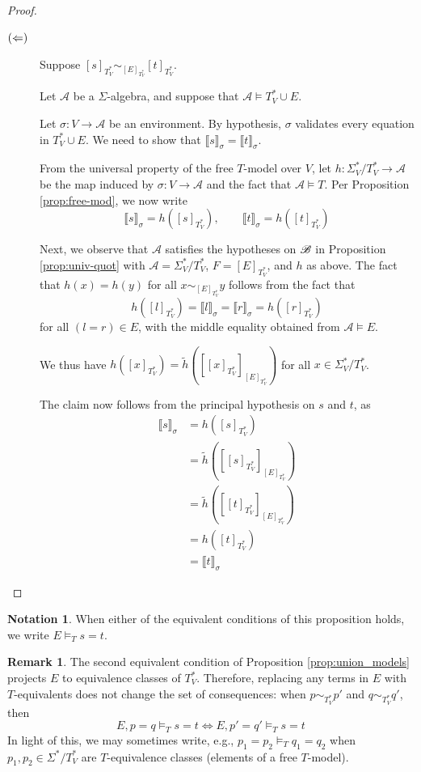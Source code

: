 \documentclass{msthesis}
\theoremstyle{definition}
\newtheorem*{notation}{Notation}
\newtheorem*{remark}{Remark}
\newcommand{\semof}[1]{\llbracket{#1}\rrbracket}
\newcommand{\Amod}{\mathscr{A}}
\begin{document}
\begin{proof}
\begin{description}
    \item[$(\Leftarrow)$]
    Suppose $[s]_{T^*_V} \sim_{[E]_{T^*_V}} [t]_{T^*_V}$.

    Let $\Amod$ be a $\Sigma$-algebra, and suppose that 
    $\Amod \models T^*_V \cup E$.
    
    Let $\sigma : V \to \Amod$ be an environment.  By hypothesis, $\sigma$ validates every equation in $T^*_V \cup E$.  We need to show that 
    $\semof{s}_\sigma = \semof{t}_\sigma$.

    From the universal property of the free $T$-model over $V$, 
    let $h : \Sigma^*_V/T^*_V \to \Amod$ be the map induced 
    by $\sigma : V \to \Amod$ and the fact that $\Amod \models T$.
    Per Proposition \ref{prop:free-mod}, we now write 
    \[ \semof{s}_\sigma = 
    h ([s]_{T^*_V}), \qquad \semof{t}_\sigma = h([t]_{T^*_V})\] 
    
    Next, we observe that $\Amod$ satisfies the hypotheses on $\mathscr{B}$ in
    Proposition \ref{prop:univ-quot} with $\Amod = \Sigma^*_V/T^*_V$, $F = [E]_{T^*_V}$,
    and $h$ as above.  The fact that $h(x)=h(y)$ for all 
    $x \sim_{[E]_{T^*_V}} y$ follows from the fact that 
    \[h([l]_{T^*_V}) = \semof{l}_\sigma = \semof{r}_\sigma 
    = h([r]_{T^*_V})\] 
    for all $(l=r) \in E$, with the middle equality obtained from $\Amod \models E$.

    We thus have $h([x]_{T^*_V}) = \tilde h([[x]_{T^*_V}]_{[E]_{T^*_V}})$ for all $x \in \Sigma^*_V/T^*_V$. 
    
    The claim now follows from the principal hypothesis on $s$ and $t$, as 
    \begin{align*}
    \semof{s}_\sigma &= h([s]_{T^*_V})  \\
    &= \tilde h([[s]_{T^*_V}]_{[E]_{T^*_V}}) \\
    &= \tilde h([[t]_{T^*_V}]_{[E]_{T^*_V}}) \\
    &= h([t]_{T^*_V})\\
    &= \semof{t}_\sigma
    \end{align*}
        
\end{description}
\end{proof}

\begin{notation}
    When either of the equivalent conditions of this proposition holds, we write $E \models_T s=t$.
\end{notation}

\begin{remark}
The second equivalent condition of Proposition \ref{prop:union_models} projects $E$ to equivalence classes of $T^*_V$.  Therefore, replacing any terms in $E$ with $T$-equivalents does not change the set of consequences: when $p \sim_{T^*_V} p'$ and $q \sim_{T^*_V} q'$, then 
\[ E, p=q \models_T s=t \iff E,p'=q' \models_T s=t \]
In light of this, we may sometimes write, e.g., $p_1 = p_2 \models_T q_1 = q_2$ when $p_1, p_2 \in \Sigma^*/{T^*_V}$
are $T$-equivalence classes (elements of a free $T$-model).
\end{remark}
\end{document}
